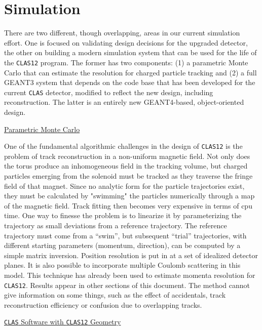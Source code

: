 \section{Simulation}


There are two different, though overlapping, areas in our current simulation 
effort. One is focused on validating design decisions for the upgraded 
detector, the other on building a modern simulation system that can be used 
for the life of the {\tt CLAS12} program. The former has two components: (1) a 
parametric Monte Carlo that can estimate the resolution for charged particle 
tracking and (2) a full GEANT3 system that depends on the code base that has 
been developed for the current {\tt CLAS} detector, modified to reflect the 
new design, including reconstruction. The latter is an entirely new 
GEANT4-based, object-oriented design.

\vskip 0.5cm

\noindent
\underline{Parametric Monte Carlo}

One of the fundamental algorithmic challenges in the design of {\tt CLAS12} 
is the problem of track reconstruction in a non-uniform magnetic field.  Not 
only does the torus produce an inhomogeneous field in the tracking volume, 
but charged particles emerging from the solenoid must be tracked as they 
traverse the fringe field of that magnet. Since no analytic form for the 
particle trajectories exist, they must be calculated by "swimming" the
particles numerically through a map of the magnetic field. Track fitting 
then becomes very expensive in terms of cpu time. One way to finesse the 
problem is to linearize it by parameterizing the trajectory as small deviations 
from a reference trajectory. The reference trajectory must come from a 
``swim'', but subsequent ``trial'' trajectories, with different starting 
parameters (momentum, direction), can be computed by a simple matrix 
inversion. Position resolution is put in at a set of idealized detector 
planes. It is also possible to incorporate multiple Coulomb scattering in 
this model. This technique has already been used to estimate momenta 
resolution for {\tt CLAS12}. Results appear in other sections of this 
document.  The method cannot give information on some things, such as the 
effect of accidentals, track reconstruction efficiency or confusion due to 
overlapping tracks.

\vskip 0.5cm

\noindent
\underline{{\tt CLAS} Software with {\tt CLAS12} Geometry}

